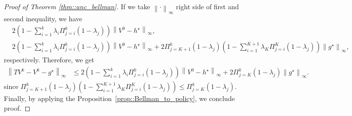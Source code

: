 \documentclass{article} %
\newcommand{\cP}{\mathcal{P}}
\newcommand*{\para}[1]{\left({#1}\right)}
\newcommand*{\infn}[1]{\left\|{#1}\right\|_{\infty}}
\begin{document}
\begin{proof}[Proof of Theorem \ref{thm::anc_bellman}]
    
    If we take $\infn{\cdot}$ right side of first and second inequality, we have 
\begin{align*}
    &2\para{1-\sum_{i=1}^{k} \lambda_i \Pi^{k}_{j=i} (1-\lambda_j)}\infn{V^0-h^{\star}}, 
     \\&2\para{1-\sum_{i=1}^{k} \lambda_i \Pi^{k}_{j=i} (1-\lambda_j)}\infn{V^0-h^{\star}}+ 2\Pi^{k}_{j=K+1} (1-\lambda_j)\para{1-\sum_{i=1}^{K+1} \lambda_{K} \Pi^{K}_{j=i} (1-\lambda_j)}\infn{g^{\star}},
\end{align*}
respectively. Therefore, we get
    \begin{align*}
        \infn{TV^k-V^k-g^{\star}} &\le 2\para{1-\sum_{i=1}^{k} \lambda_i \Pi^{k}_{j=i} (1-\lambda_j)}\infn{V^0-h^{\star}} + 2\Pi^{k}_{j=K} (1-\lambda_j) \infn{g^{\star}}.
    \end{align*}
    since $\Pi^{k}_{j=K+1} (1-\lambda_j)\para{1-\sum_{i=1}^{K+1} \lambda_{K} \Pi^{K}_{j=i} (1-\lambda_j)} \le \Pi^{k}_{j=K} (1-\lambda_j)$. Finally, by applying the Proposition~\ref{prop::Bellman_to_policy}, we conclude proof.
\end{proof}
\end{document}
